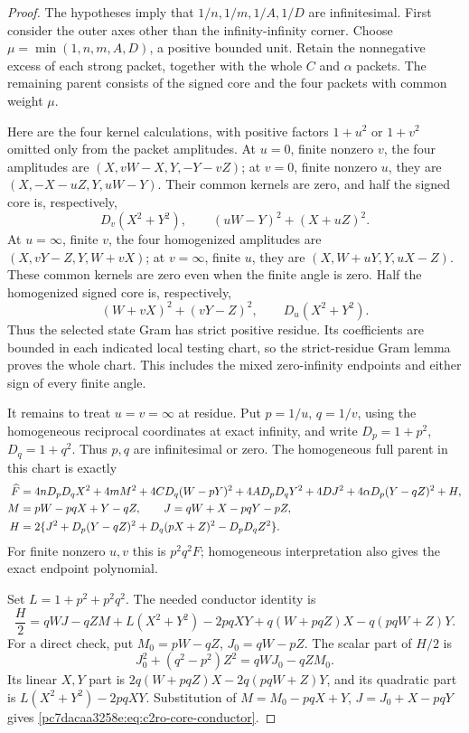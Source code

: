\begin{proof}
The hypotheses imply that $1/n,1/m,1/A,1/D$ are infinitesimal.
First consider the outer axes other than the infinity-infinity corner.
Choose $\mu=\min(1,n,m,A,D)$, a positive bounded unit.  Retain the
nonnegative excess of each strong packet, together with the whole
$C$ and $\alpha$ packets.  The remaining parent consists of the signed
core and the four packets with common weight $\mu$.

Here are the four kernel calculations, with positive factors
$1+u^2$ or $1+v^2$ omitted only from the packet amplitudes.
At $u=0$, finite nonzero $v$, the four amplitudes are
$(X,vW-X,Y,-Y-vZ)$; at $v=0$, finite nonzero $u$, they are
$(X,-X-uZ,Y,uW-Y)$.  Their common kernels are zero, and half the
signed core is, respectively,
\[
 D_v(X^2+Y^2),\qquad (uW-Y)^2+(X+uZ)^2.
\]
At $u=\infty$, finite $v$, the four homogenized amplitudes are
$(X,vY-Z,Y,W+vX)$; at $v=\infty$, finite $u$, they are
$(X,W+uY,Y,uX-Z)$.  These common kernels are zero even when the
finite angle is zero.  Half the homogenized signed core is, respectively,
\[
 (W+vX)^2+(vY-Z)^2,\qquad D_u(X^2+Y^2).
\]
Thus the selected state Gram has strict positive residue.  Its
coefficients are bounded in each indicated local testing chart, so the
strict-residue Gram lemma proves the whole chart.  This includes the
mixed zero-infinity endpoints and either sign of every finite angle.

It remains to treat $u=v=\infty$ at residue.  Put $p=1/u$, $q=1/v$,
using the homogeneous reciprocal coordinates at exact infinity, and
write $D_p=1+p^2$, $D_q=1+q^2$.  Thus $p,q$ are infinitesimal or zero.
The homogeneous full parent in this chart is exactly
\begin{align}
\widehat F={}&4nD_pD_qX^2+4mM^2+4CD_q(W-pY)^2
       +4AD_pD_qY^2+4DJ^2+4\alpha D_p(Y-qZ)^2+H,\notag\\
 M={}&pW-pqX+Y-qZ,\qquad
 J=qW+X-pqY-pZ,\notag\\
 H={}&2\{J^2+D_p(Y-qZ)^2+D_q(pX+Z)^2-D_pD_qZ^2\}.
\label{pc7dacaa3258e:eq:c2ro-parent}
\end{align}
For finite nonzero $u,v$ this is $p^2q^2F$; homogeneous interpretation
also gives the exact endpoint polynomial.

Set $L=1+p^2+p^2q^2$.  The needed conductor identity is
\begin{equation}
\frac H2=qWJ-qZM+L(X^2+Y^2)-2pqXY
             +q(W+pqZ)X-q(pqW+Z)Y.
\label{pc7dacaa3258e:eq:c2ro-core-conductor}
\end{equation}
For a direct check, put $M_0=pW-qZ$, $J_0=qW-pZ$.  The scalar part
of $H/2$ is
\[
 J_0^2+(q^2-p^2)Z^2=qWJ_0-qZM_0.
\]
Its linear $X,Y$ part is
$2q(W+pqZ)X-2q(pqW+Z)Y$, and its quadratic part is
$L(X^2+Y^2)-2pqXY$.  Substitution of
$M=M_0-pqX+Y$, $J=J_0+X-pqY$ gives
\eqref{pc7dacaa3258e:eq:c2ro-core-conductor}.


\end{proof}
